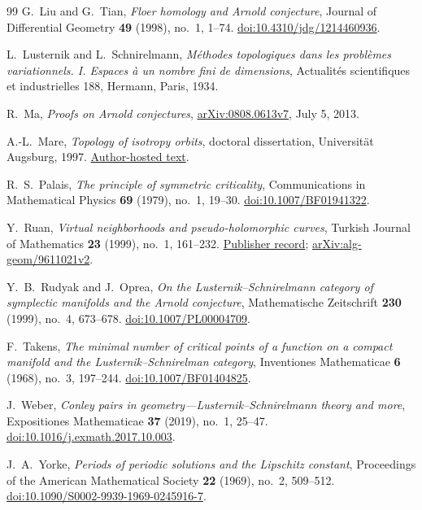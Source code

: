 \begin{thebibliography}{99}
G.~Liu and G.~Tian,
\emph{Floer homology and Arnold conjecture},
Journal of Differential Geometry \textbf{49} (1998), no.~1, 1--74.
\href{https://doi.org/10.4310/jdg/1214460936}{doi:10.4310/jdg/1214460936}.

L.~Lusternik and L.~Schnirelmann,
\emph{M\'ethodes topologiques dans les probl\`emes variationnels.
I. Espaces \`a un nombre fini de dimensions},
Actualit\'es scientifiques et industrielles 188, Hermann, Paris, 1934.

R.~Ma,
\emph{Proofs on Arnold conjectures},
\href{https://arxiv.org/abs/0808.0613v7}{arXiv:0808.0613v7}, July 5, 2013.

A.-L.~Mare,
\emph{Topology of isotropy orbits},
doctoral dissertation, Universit\"at Augsburg, 1997.
\href{https://uregina.ca/~mareal/papers/Teza.pdf}{Author-hosted text}.

R.~S.~Palais,
\emph{The principle of symmetric criticality},
Communications in Mathematical Physics \textbf{69} (1979), no.~1, 19--30.
\href{https://doi.org/10.1007/BF01941322}{doi:10.1007/BF01941322}.

Y.~Ruan,
\emph{Virtual neighborhoods and pseudo-holomorphic curves},
Turkish Journal of Mathematics \textbf{23} (1999), no.~1, 161--232.
\href{https://journals.tubitak.gov.tr/math/vol23/iss1/10/}{Publisher record};
\href{https://arxiv.org/abs/alg-geom/9611021v2}{arXiv:alg-geom/9611021v2}.

Y.~B.~Rudyak and J.~Oprea,
\emph{On the Lusternik--Schnirelmann category of symplectic manifolds
and the Arnold conjecture},
Mathematische Zeitschrift \textbf{230} (1999), no.~4, 673--678.
\href{https://doi.org/10.1007/PL00004709}{doi:10.1007/PL00004709}.

F.~Takens,
\emph{The minimal number of critical points of a function on a compact
manifold and the Lusternik--Schnirelman category},
Inventiones Mathematicae \textbf{6} (1968), no.~3, 197--244.
\href{https://doi.org/10.1007/BF01404825}{doi:10.1007/BF01404825}.

J.~Weber,
\emph{Conley pairs in geometry---Lusternik--Schnirelmann theory and more},
Expositiones Mathematicae \textbf{37} (2019), no.~1, 25--47.
\href{https://doi.org/10.1016/j.exmath.2017.10.003}{doi:10.1016/j.exmath.2017.10.003}.

J.~A.~Yorke,
\emph{Periods of periodic solutions and the Lipschitz constant},
Proceedings of the American Mathematical Society \textbf{22} (1969),
no.~2, 509--512.
\href{https://doi.org/10.1090/S0002-9939-1969-0245916-7}{doi:10.1090/S0002-9939-1969-0245916-7}.
\end{thebibliography}
